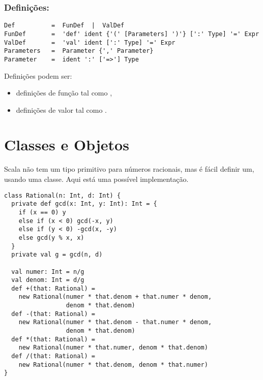 \subsection*{Defini\c{c}\~{o}es:}
\begin{lstlisting}
Def          =  FunDef  |  ValDef
FunDef       =  'def' ident {'(' [Parameters] ')'} [':' Type] '=' Expr
ValDef       =  'val' ident [':' Type] '=' Expr
Parameters   =  Parameter {',' Parameter}
Parameter    =  ident ':' ['=>'] Type
\end{lstlisting}
Defini\c{c}\~{o}es podem ser:
\begin{itemize}
\item
defini\c{c}\~{o}es de fun\c{c}\~{a}o tal como ,
\item
defini\c{c}\~{o}es de valor tal como .
\end{itemize}

\chapter{Classes e Objetos}
\label{chap:classes}

Scala n\~{a}o tem um tipo primitivo para n\'{u}meros racionais, mas \'{e} f\'{a}cil 
definir um, usando uma classe. Aqui est\'{a} uma poss\'{i}vel implementa\c{c}\~{a}o.

\begin{lstlisting}
class Rational(n: Int, d: Int) {
  private def gcd(x: Int, y: Int): Int = {
    if (x == 0) y
    else if (x < 0) gcd(-x, y)
    else if (y < 0) -gcd(x, -y)
    else gcd(y % x, x)
  }
  private val g = gcd(n, d)

  val numer: Int = n/g
  val denom: Int = d/g
  def +(that: Rational) =
    new Rational(numer * that.denom + that.numer * denom,
                 denom * that.denom)
  def -(that: Rational) =
    new Rational(numer * that.denom - that.numer * denom, 
                 denom * that.denom)
  def *(that: Rational) =
    new Rational(numer * that.numer, denom * that.denom)
  def /(that: Rational) =
    new Rational(numer * that.denom, denom * that.numer)
}
\end{lstlisting}

